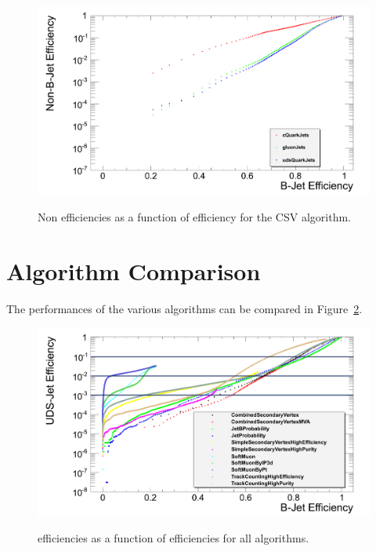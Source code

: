 \begin{figure}[hbtp]
   \centering
     \includegraphics[width=\textwidth]{Chapters/04_Analysis/04a_BTags/Images/CombinedSecondaryVertex_nonBJetEfficiency_v_bJetEfficiency}\\
     \caption[Non \bjet efficiencies as a function of \bjet efficiency for the CSV algorithm.]{Non \bjet
     efficiencies as a function of \bjet efficiency for the CSV algorithm.}
     \label{fig:CSV_jet_efficiencies}
\end{figure}

\section{Algorithm Comparison}
\label{algorithm_comparison}

The performances of the various algorithms can be compared in Figure~\ref{fig:uds_eff_v_b_eff}.

\begin{figure}[hbtp]
   \centering
     \includegraphics[width=\textwidth]{Chapters/04_Analysis/04a_BTags/Images/udsJetEfficiency_v_bJetEfficiency_withLegend_wp}\\
     \caption[udsjet efficiencies as a function of \bjet efficiencies for all algorithms.]{\udsjet
     efficiencies as a function of \bjet efficiencies for all algorithms.}
     \label{fig:uds_eff_v_b_eff}
\end{figure}

